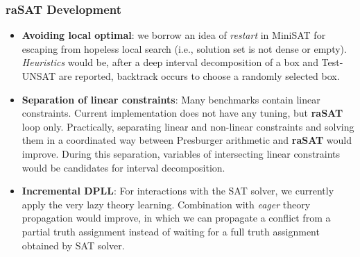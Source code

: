 \documentclass[runningheads,a4paper,oribibl]{llncs}
\begin{document}
{\subsubsection{\textbf{raSAT} Development}

\begin{itemize}
\item \textbf{Avoiding local optimal}: 
we borrow an idea of \emph{restart} in MiniSAT for escaping from hopeless local search 
(i.e., solution set is not dense or empty). 
\emph{Heuristics} would be, after a deep interval decomposition of 
a box and Test-UNSAT are reported, backtrack occurs to choose a randomly selected box. 

\item \textbf{Separation of linear constraints}: 
Many benchmarks contain linear constraints. Current implementation does not have 
any tuning, but {\bf raSAT} loop only. 
Practically, separating linear and non-linear constraints and solving them 
in a coordinated way between Presburger arithmetic and {\bf raSAT} would improve. 
During this separation, variables of intersecting linear constraints would be candidates 
for interval decomposition. 

\item \textbf{Incremental DPLL}: For interactions with the SAT solver, 
we currently apply the very lazy theory learning. Combination with 
\emph{eager} theory propagation would improve, in which we can propagate 
a conflict from a partial truth assignment instead of waiting 
for a full truth assignment obtained by SAT solver.
\end{itemize}
}
\end{document}
